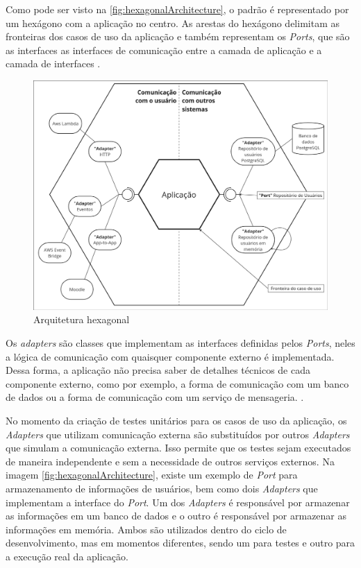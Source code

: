 Como pode ser visto na \autoref{fig:hexagonalArchitecture}, o padrão é representado por um hexágono com a aplicação no centro. As arestas do hexágono delimitam as fronteiras dos casos de uso da aplicação e também representam os \textit{Ports}, que são as interfaces as interfaces de comunicação entre a camada de aplicação e a camada de interfaces \citep{cockburn2017}.

\begin{figure}[H]
\caption{Arquitetura hexagonal}
\label{fig:hexagonalArchitecture}
\includegraphics[width=\textwidth]{capitulos/1-revisao-da-literatura/files/hexagonal.png}
\end{figure}

Os \textit{adapters} são classes que implementam as interfaces definidas pelos \textit{Ports}, neles a lógica de comunicação com quaisquer componente externo é implementada. Dessa forma, a aplicação não precisa saber de detalhes técnicos de cada componente externo, como por exemplo, a forma de comunicação com um banco de dados ou a forma de comunicação com um serviço de mensageria. \citep{cockburn2017}.

No momento da criação de testes unitários para os casos de uso da aplicação, os \textit{Adapters} que utilizam comunicação externa são substituídos por outros \textit{Adapters} que simulam a comunicação externa. Isso permite que os testes sejam executados de maneira independente e sem a necessidade de outros serviços externos. Na imagem \autoref{fig:hexagonalArchitecture}, existe um exemplo de \textit{Port} para armazenamento de informações de usuários, bem como dois \textit{Adapters} que implementam a interface do \textit{Port}. Um dos \textit{Adapters} é responsável por armazenar as informações em um banco de dados e o outro é responsável por armazenar as informações em memória. Ambos são utilizados dentro do ciclo de desenvolvimento, mas em momentos diferentes, sendo um para testes e outro para a execução real da aplicação.

